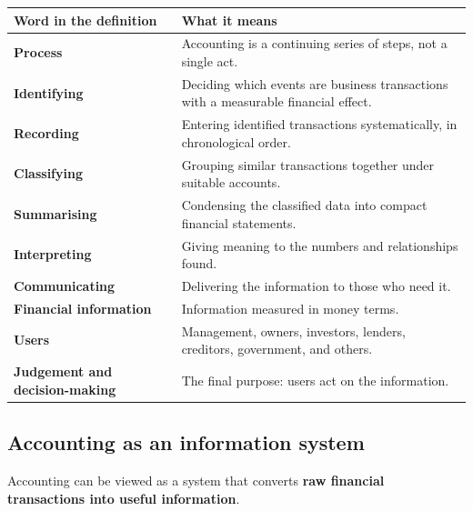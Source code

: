 \documentclass[11pt,a4paper]{article}
\begin{document}
\begin{center}
\small
\begin{tabularx}{\textwidth}{@{}l Y@{}}
\toprule
{}\textbf{Word in the definition} & \textbf{What it means}\\
\midrule
\textbf{Process} & Accounting is a continuing series of steps, not a single act.\\
\textbf{Identifying} & Deciding which events are business transactions with a measurable financial effect.\\
\textbf{Recording} & Entering identified transactions systematically, in chronological order.\\
\textbf{Classifying} & Grouping similar transactions together under suitable accounts.\\
\textbf{Summarising} & Condensing the classified data into compact financial statements.\\
\textbf{Interpreting} & Giving meaning to the numbers and relationships found.\\
\textbf{Communicating} & Delivering the information to those who need it.\\
\textbf{Financial information} & Information measured in money terms.\\
\textbf{Users} & Management, owners, investors, lenders, creditors, government, and others.\\
\textbf{Judgement and decision-making} & The final purpose: users act on the information.\\
\bottomrule
\end{tabularx}
\end{center}

\subsection{Accounting as an information system}

Accounting can be viewed as a system that converts \textbf{raw financial transactions into useful
information}.

\begin{center}
\end{center}
\end{document}

